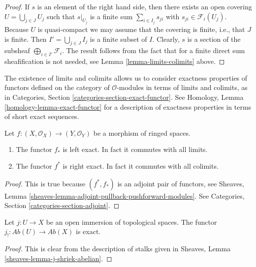 \begin{proof}
If $s$ is an element of the right hand side, then
there exists an open covering $U = \bigcup_{j \in J} U_j$
such that $s|_{U_j}$ is a finite sum
$\sum_{i \in I_j} s_{ji}$ with $s_{ji} \in \mathcal{F}_i(U_j)$.
Because $U$ is quasi-compact we may assume that the
covering is finite, i.e., that $J$ is finite.
Then $I' = \bigcup_{j \in J} I_j$ is a finite subset of
$I$. Clearly, $s$ is a section of the subsheaf
$\bigoplus_{i \in I'} \mathcal{F}_i$. The result follows
from the fact that for a finite direct sum sheafification
is not needed, see Lemma \ref{lemma-limits-colimits} above.
\end{proof}

\noindent
The existence of limits and colimits
allows us to consider exactness properties of
functors defined on the category of $\mathcal{O}$-modules
in terms of limits and colimits, as in
Categories, Section \ref{categories-section-exact-functor}.
See Homology, Lemma \ref{homology-lemma-exact-functor} for a
description of exactness
properties in terms of short exact sequences.

\begin{lemma}
\label{lemma-exactness-pushforward-pullback}
Let $f : (X, \mathcal{O}_X) \to (Y, \mathcal{O}_Y)$
be a morphism of ringed spaces.
\begin{enumerate}
\item The functor $f_*$ is left exact. In fact it commutes with
all limits.
\item The functor $f^*$ is right exact. In fact it commutes
with all colimits.
\end{enumerate}
\end{lemma}

\begin{proof}
This is true because $(f^*, f_*)$ is an adjoint pair
of functors, see
Sheaves, Lemma \ref{sheaves-lemma-adjoint-pullback-pushforward-modules}.
See Categories, Section \ref{categories-section-adjoint}.
\end{proof}

\begin{lemma}
\label{lemma-j-shriek-exact}
Let $j : U \to X$ be an open immersion of topological spaces.
The functor $j_! : \textit{Ab}(U) \to \textit{Ab}(X)$
is exact.
\end{lemma}

\begin{proof}
This is clear from the description of stalks
given in Sheaves, Lemma \ref{sheaves-lemma-j-shriek-abelian}.
\end{proof}














